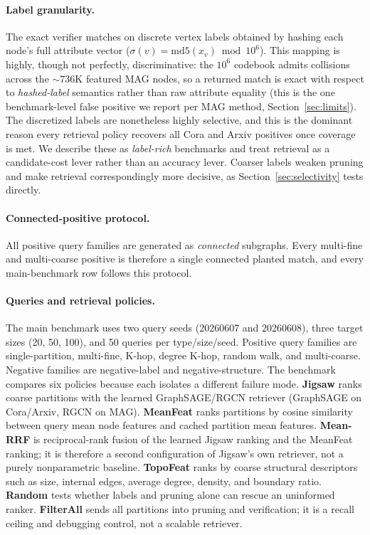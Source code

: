\documentclass[runningheads]{llncs}
\begin{document}
\paragraph{Label granularity.} The exact verifier matches on discrete vertex labels obtained by hashing each node's full attribute vector ($\sigma(v)=\mathrm{md5}(x_v)\bmod 10^{6}$). This mapping is highly, though not perfectly, discriminative: the $10^{6}$ codebook admits collisions across the ${\sim}736$K featured MAG nodes, so a returned match is exact with respect to \emph{hashed-label} semantics rather than raw attribute equality (this is the one benchmark-level false positive we report per MAG method, Section~\ref{sec:limits}). The discretized labels are nonetheless highly selective, and this is the dominant reason every retrieval policy recovers all Cora and Arxiv positives once coverage is met. We describe these as \emph{label-rich} benchmarks and treat retrieval as a candidate-cost lever rather than an accuracy lever. Coarser labels weaken pruning and make retrieval correspondingly more decisive, as Section~\ref{sec:selectivity} tests directly.

\paragraph{Connected-positive protocol.}
All positive query families are generated as \emph{connected} subgraphs. Every multi-fine and multi-coarse positive is therefore a single connected planted match, and every main-benchmark row follows this protocol.

\paragraph{Queries and retrieval policies.}
The main benchmark uses two query seeds (20260607 and 20260608), three target sizes (20, 50, 100), and 50 queries per type/size/seed. Positive query families are single-partition, multi-fine, K-hop, degree K-hop, random walk, and multi-coarse. Negative families are negative-label and negative-structure. The benchmark compares six policies because each isolates a different failure mode. \textbf{Jigsaw} ranks coarse partitions with the learned GraphSAGE/RGCN retriever (GraphSAGE on Cora/Arxiv, RGCN on MAG). \textbf{MeanFeat} ranks partitions by cosine similarity between query mean node features and cached partition mean features. \textbf{Mean-RRF} is reciprocal-rank fusion of the learned Jigsaw ranking and the MeanFeat ranking; it is therefore a second configuration of Jigsaw's own retriever, not a purely nonparametric baseline. \textbf{TopoFeat} ranks by coarse structural descriptors such as size, internal edges, average degree, density, and boundary ratio. \textbf{Random} tests whether labels and pruning alone can rescue an uninformed ranker. \textbf{FilterAll} sends all partitions into pruning and verification; it is a recall ceiling and debugging control, not a scalable retriever.
\end{document}
